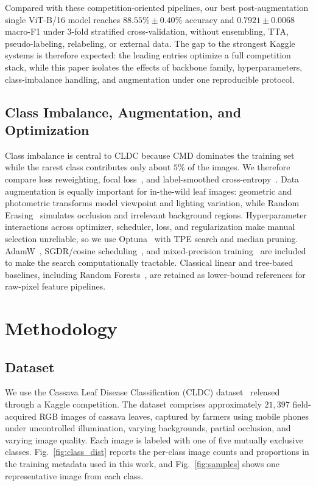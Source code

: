 \documentclass[conference]{IEEEtran}
\begin{document}
Compared with these competition-oriented pipelines, our best post-augmentation single ViT-B/16 model reaches $88.55\% \pm 0.40\%$ accuracy and $0.7921 \pm 0.0068$ macro-F1 under 3-fold stratified cross-validation, without ensembling, TTA, pseudo-labeling, relabeling, or external data. The gap to the strongest Kaggle systems is therefore expected: the leading entries optimize a full competition stack, while this paper isolates the effects of backbone family, hyperparameters, class-imbalance handling, and augmentation under one reproducible protocol.

\subsection{Class Imbalance, Augmentation, and Optimization}
Class imbalance is central to CLDC because CMD dominates the training set while the rarest class contributes only about $5\%$ of the images. We therefore compare loss reweighting, focal loss~\cite{lin2017focal}, and label-smoothed cross-entropy~\cite{szegedy2016label}. Data augmentation is equally important for in-the-wild leaf images: geometric and photometric transforms model viewpoint and lighting variation, while Random Erasing~\cite{zhong2020randomerasing} simulates occlusion and irrelevant background regions. Hyperparameter interactions across optimizer, scheduler, loss, and regularization make manual selection unreliable, so we use Optuna~\cite{akiba2019optuna} with TPE search and median pruning. AdamW~\cite{loshchilov2019adamw}, SGDR/cosine scheduling~\cite{loshchilov2017sgdr}, and mixed-precision training~\cite{micikevicius2018mixed} are included to make the search computationally tractable. Classical linear and tree-based baselines, including Random Forests~\cite{breiman2001randomforests}, are retained as lower-bound references for raw-pixel feature pipelines.

\section{Methodology}
\label{sec:method}

\subsection{Dataset}
\label{ssec:data}
We use the Cassava Leaf Disease Classification (CLDC) dataset~\cite{mwebaze2020cassava} released through a Kaggle competition. The dataset comprises approximately $21{,}397$ field-acquired RGB images of cassava leaves, captured by farmers using mobile phones under uncontrolled illumination, varying backgrounds, partial occlusion, and varying image quality. Each image is labeled with one of five mutually exclusive classes. Fig.~\ref{fig:class_dist} reports the per-class image counts and proportions in the training metadata used in this work, and Fig.~\ref{fig:samples} shows one representative image from each class.
\end{document}
